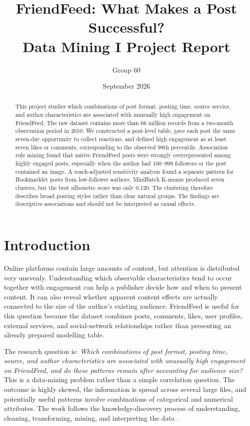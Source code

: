 \documentclass[10pt,a4paper]{article}
\title{\vspace{-1.4cm}\textbf{FriendFeed: What Makes a Post Successful?}\\
\large Data Mining I Project Report}
\author{Group 60}
\date{September 2026}
\begin{document}
\maketitle
\vspace{-0.8cm}

\begin{abstract}
This project studies which combinations of post format, posting time, source service, and author characteristics are associated with unusually high engagement on FriendFeed. The raw dataset contains more than 66 million records from a two-month observation period in 2010. We constructed a post-level table, gave each post the same seven-day opportunity to collect reactions, and defined high engagement as at least seven likes or comments, corresponding to the observed 99th percentile. Association rule mining found that native FriendFeed posts were strongly overrepresented among highly engaged posts, especially when the author had 100--999 followers or the post contained an image. A reach-adjusted sensitivity analysis found a separate pattern for Bookmarklet posts from low-follower authors. MiniBatch K-means produced seven clusters, but the best silhouette score was only 0.120. The clustering therefore describes broad posting styles rather than clear natural groups. The findings are descriptive associations and should not be interpreted as causal effects.
\end{abstract}

\section{Introduction}

Online platforms contain large amounts of content, but attention is distributed very unevenly. Understanding which observable characteristics tend to occur together with engagement can help a publisher decide how and when to present content. It can also reveal whether apparent content effects are actually connected to the size of the author's existing audience. FriendFeed is useful for this question because the dataset combines posts, comments, likes, user profiles, external services, and social-network relationships rather than presenting an already prepared modelling table.

The research question is: \emph{Which combinations of post format, posting time, source, and author characteristics are associated with unusually high engagement on FriendFeed, and do these patterns remain after accounting for audience size?} This is a data-mining problem rather than a simple correlation question. The outcome is highly skewed, the information is spread across several large files, and potentially useful patterns involve combinations of categorical and numerical attributes. The work follows the knowledge-discovery process of understanding, cleaning, transforming, mining, and interpreting the data \cite{fayyad1996}.
\end{document}
